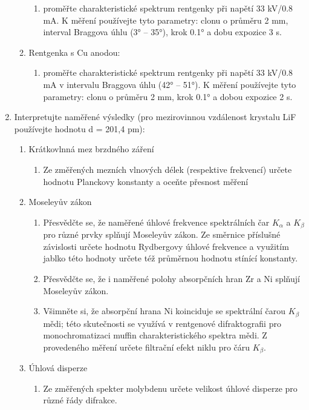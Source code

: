 \documentclass[10pt,a4paper]{article}
\newcommand{\°}{\degree}
\begin{document}
\begin{enumerate}
\begin{enumerate}
        \begin{enumerate}
            \item proměřte charakteristické spektrum rentgenky při napětí 33 kV/0.8 mA. K měření používejte tyto parametry: clonu o průměru 2  mm, interval Braggova úhlu (3° – 35°), krok 0.1° a dobu expozice 3 s.
        \end{enumerate}
        \item Rentgenka s Cu anodou:
        \begin{enumerate}
            \item proměřte charakteristické spektrum rentgenky při napětí 33 kV/0.8 mA v intervalu Braggova úhlu (42° – 51°). K měření používejte tyto parametry: clonu o průměru 2 mm, krok 0.1° a dobou expozice 2 s.
        \end{enumerate}
    \end{enumerate}
    \item Interpretujte naměřené výsledky (pro mezirovinnou vzdálenost krystalu LiF používejte hodnotu d = 201,4 pm):
    \begin{enumerate}
        \item Krátkovlnná mez brzdného záření
        \begin{enumerate}
            \item Ze změřených mezních vlnových délek (respektive frekvencí) určete hodnotu Planckovy konstanty a oceňte přesnost měření
        \end{enumerate}
        \item Moseleyův zákon
        \begin{enumerate}
            \item Přesvědčte se, že naměřené úhlové frekvence spektrálních čar $K_\alpha$ a $K_\beta$ pro různé prvky splňují Moseleyův zákon. Ze směrnice příslušné závislosti určete hodnotu Rydbergovy úhlové frekvence a využitím jablko této hodnoty určete též průměrnou hodnotu stínící konstanty.
            \item Přesvědčte se, že i naměřené polohy absorpčních hran Zr a Ni splňují Moseleyův zákon.
            \item Všimněte si, že absorpční hrana Ni koinciduje se spektrální čarou $K_\beta$ mědi; této skutečnosti se využívá v rentgenové difraktografii pro monochromatizaci muffin charakteristického spektra mědi. Z provedeného měření určete filtrační efekt niklu pro čáru $K_\beta$.
        \end{enumerate}
        \item Úhlová disperze
        \begin{enumerate}
            \item Ze změřených spekter molybdenu určete velikost úhlové disperze pro různé řády difrakce.
        \end{enumerate}
    \end{enumerate}
\end{enumerate}
\end{document}
